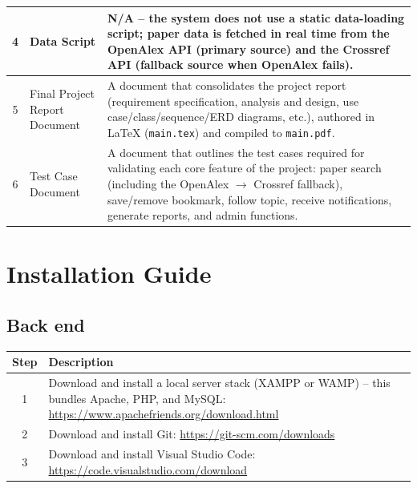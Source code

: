 \documentclass[12pt,a4paper]{article}
\begin{document}
{{\begin{table}[htbp]
\begin{tabularx}{\textwidth}{|c|L{3cm}|X|}
			4 & Data Script &
			N/A -- the system does not use a static data-loading script; paper data is fetched in real time from the OpenAlex API (primary source) and the Crossref API (fallback source when OpenAlex fails). \\
			\hline
			
			5 & Final Project Report Document &
			A document that consolidates the project report (requirement specification, analysis and design, use case/class/sequence/ERD diagrams, etc.), authored in LaTeX (\texttt{main.tex}) and compiled to \texttt{main.pdf}. \\
			\hline
			
			6 & Test Case Document &
			A document that outlines the test cases required for validating each core feature of the project: paper search (including the OpenAlex $\rightarrow$ Crossref fallback), save/remove bookmark, follow topic, receive notifications, generate reports, and admin functions. \\
			\hline
			
		\end{tabularx}
	\end{table}
	


\section{  Installation Guide}

\subsection{Back end}
{
	\begin{table}[H]
		\centering
		
		\begin{tabularx}{\textwidth}{|c|X|}
			\hline
			\rowcolor{yellowheader}
			\textbf{Step} & \textbf{Description} \\
			\hline
			
			1 & Download and install a local server stack (XAMPP or WAMP) -- this bundles Apache, PHP, and MySQL: \url{https://www.apachefriends.org/download.html} \\
			\hline
			
			\rowcolor{yellowrow}
			2 & Download and install Git: \url{https://git-scm.com/downloads} \\
			\hline
			
			3 & Download and install Visual Studio Code: \url{https://code.visualstudio.com/download} \\
			\hline
			

\end{tabularx}
\end{table}}}}
\end{document}
